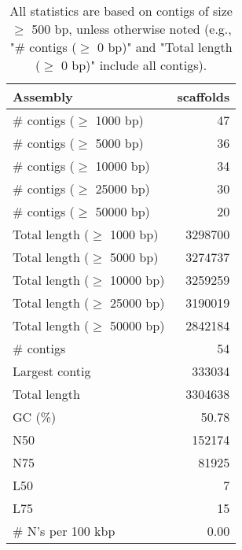 \documentclass[12pt,a4paper]{article}
\begin{document}
\begin{table}[ht]
\begin{center}
\caption{All statistics are based on contigs of size $\geq$ 500 bp, unless otherwise noted (e.g., "\# contigs ($\geq$ 0 bp)" and "Total length ($\geq$ 0 bp)" include all contigs).}
\begin{tabular}{|l*{1}{|r}|}
\hline
Assembly & scaffolds \\ \hline
\# contigs ($\geq$ 1000 bp) & 47 \\ \hline
\# contigs ($\geq$ 5000 bp) & 36 \\ \hline
\# contigs ($\geq$ 10000 bp) & 34 \\ \hline
\# contigs ($\geq$ 25000 bp) & 30 \\ \hline
\# contigs ($\geq$ 50000 bp) & 20 \\ \hline
Total length ($\geq$ 1000 bp) & 3298700 \\ \hline
Total length ($\geq$ 5000 bp) & 3274737 \\ \hline
Total length ($\geq$ 10000 bp) & 3259259 \\ \hline
Total length ($\geq$ 25000 bp) & 3190019 \\ \hline
Total length ($\geq$ 50000 bp) & 2842184 \\ \hline
\# contigs & 54 \\ \hline
Largest contig & 333034 \\ \hline
Total length & 3304638 \\ \hline
GC (\%) & 50.78 \\ \hline
N50 & 152174 \\ \hline
N75 & 81925 \\ \hline
L50 & 7 \\ \hline
L75 & 15 \\ \hline
\# N's per 100 kbp & 0.00 \\ \hline
\end{tabular}
\end{center}
\end{table}
\end{document}

